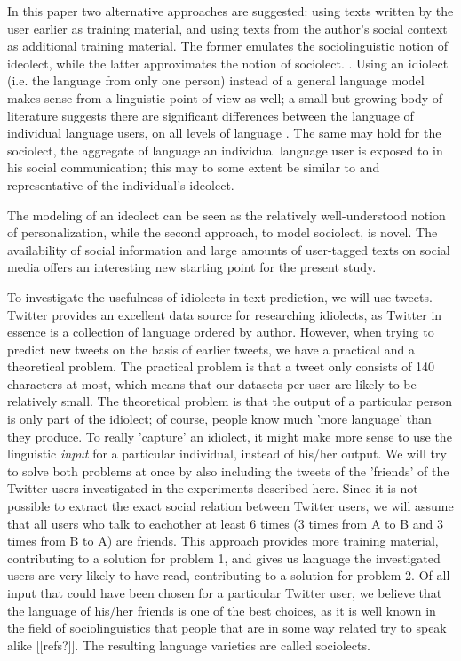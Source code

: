 \documentclass[11pt]{article}
\begin{document}
In this paper two alternative approaches are suggested: using texts written by the user earlier as training material, and using texts from the author's social context as additional training material. The former emulates the sociolinguistic notion of ideolect, while the latter approximates the notion of sociolect.  . Using an idiolect (i.e. the language from only one person) instead of a general language model makes sense from a linguistic point of view as well; a small but growing body of literature suggests there are significant differences between the language of individual language users, on all levels of language \cite[among others]{mollin09,barlow10}. The same may hold for the sociolect, the aggregate of language an individual language user is exposed to in his social communication; this may to some extent be similar to and representative of the individual's ideolect.


The modeling of an ideolect can be seen as the relatively well-understood notion of personalization, while the second approach, to model sociolect, is novel. The availability of social information and large amounts of user-tagged texts on social media offers an interesting new starting point for the present study.

To investigate the usefulness of idiolects in text prediction, we will use tweets. Twitter provides an excellent data source for researching idiolects, as Twitter in essence is a collection of language ordered by author. However, when trying to predict new tweets on the basis of earlier tweets, we have a practical and a theoretical problem. The practical problem is that a tweet only consists of 140 characters at most, which means that our datasets per user are likely to be relatively small. The theoretical problem is that the output of a particular person is only part of the idiolect; of course, people know much 'more language' than they produce. To really 'capture' an idiolect, it might make more sense to use the linguistic \emph{input} for a particular individual, instead of his/her output. We will try to solve both problems at once by also including the tweets of the 'friends' of the Twitter users investigated in the experiments described here. Since it is not possible to extract the exact social relation between Twitter users, we will assume that all users who talk to eachother at least 6 times (3 times from A to B and 3 times from B to A) are friends. This approach provides more training material, contributing to a solution for problem 1, and gives us language the investigated users are very likely to have read, contributing to a solution for problem 2. Of all input that could have been chosen for a particular Twitter user, we believe that the language of his/her friends is one of the best choices, as it is well known in the field of sociolinguistics that people that are in some way related try to speak alike [[refs?]]. The resulting language varieties are called sociolects.
\end{document}

